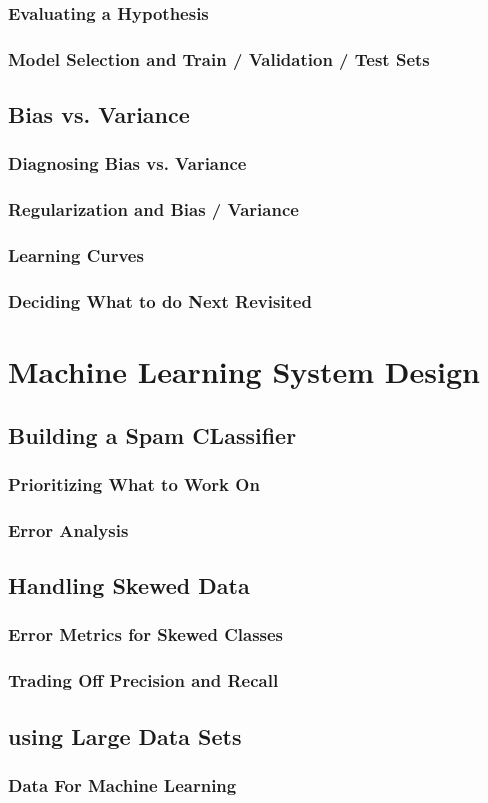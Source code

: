 \documentclass{article}
\begin{document}
\subsubsection{Evaluating a Hypothesis}
\subsubsection{Model Selection and Train / Validation / Test Sets}
\subsection{Bias vs. Variance}
\subsubsection{Diagnosing Bias vs. Variance}
\subsubsection{Regularization and Bias / Variance}
\subsubsection{Learning Curves}
\subsubsection{Deciding What to do Next Revisited}


\section{Machine Learning System Design}
\subsection{Building a Spam CLassifier}
\subsubsection{Prioritizing What to Work On}
\subsubsection{Error Analysis}
\subsection{Handling Skewed Data}
\subsubsection{Error Metrics for Skewed Classes}
\subsubsection{Trading Off Precision and Recall}
\subsection{using Large Data Sets}
\subsubsection{Data For Machine Learning}
\end{document}
